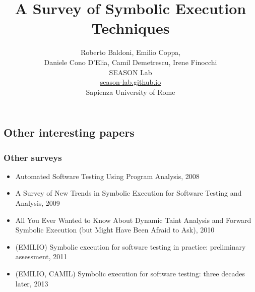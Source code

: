 \documentclass[10pt, a4paper]{article}
\title{A Survey of Symbolic Execution Techniques}
\author{
Roberto Baldoni, Emilio Coppa, \\ 
Daniele Cono D'Elia, Camil Demetrescu, Irene Finocchi\\
SEASON Lab  \\
\url{season-lab.github.io} \\
Sapienza University of Rome  \\
}
\begin{document}
\maketitle
\tableofcontents

\newpage




\newpage



\subsection{Other interesting papers}

\subsubsection{Other surveys}
\begin{itemize}
\item \cite{GDLNRST-IEEESW08} Automated Software Testing Using Program Analysis, 2008
\item \cite{PV-JSTTT09} A Survey of New Trends in Symbolic Execution for Software Testing and Analysis, 2009
\item \cite{SAB-SP10} All You Ever Wanted to Know About Dynamic Taint Analysis and Forward Symbolic Execution (but Might Have Been Afraid to Ask), 2010
\item (EMILIO) \cite{CGK-ICSE11} Symbolic execution for software testing in practice: preliminary assessment, 2011
\item (EMILIO, CAMIL) \cite{CS-CACM13} Symbolic execution for software testing: three decades later, 2013
\end{itemize}
\end{document}
